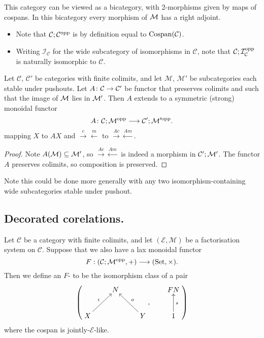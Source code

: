 This category can be viewed as a bicategory, with 2-morphisms given by maps of
cospans. In this bicategory every morphism of $\mathcal M$ has a right adjoint.

\begin{examples}
  \begin{itemize}
    \item Note that $\mathcal C; \mathcal C^{\mathrm{opp}}$ is by definition equal to
      $\operatorname{{Cospan}}(\mathcal C)$. 

    \item Writing $\mathcal I_{\mathcal C}$ for the wide subcategory of
      isomorphisms in $\mathcal C$, note that $\mathcal C;\mathcal I_{\mathcal
      C}^{\mathrm{opp}}$ is naturally isomorphic to $\mathcal C$.
  \end{itemize}
\end{examples}

\begin{lemma}
  Let $\mathcal C$, $\mathcal C'$ be categories with finite colimits, and let
  $\mathcal M$, $\mathcal M'$ be subcategories each stable under pushouts. Let
  $A{\colon} \mathcal C \to \mathcal C'$ be functor that preserves colimits and such
  that the image of $\mathcal M$ lies in $\mathcal M'$. Then $A$ extends to a symmetric
  (strong) monoidal functor
  \[
    A{\colon} \mathcal C;\mathcal M^{\mathrm{opp}} \longrightarrow \mathcal C'; \mathcal M'^{\mathrm{opp}}.
  \]
  mapping $X$ to $AX$ and $\stackrel{c}\rightarrow \stackrel{m}\leftarrow$ to
  $\stackrel{Ac}\rightarrow \stackrel{Am}\leftarrow$.
\end{lemma}
\begin{proof}
  Note $A(\mathcal M) \subseteq \mathcal M'$, so $\stackrel{Ac}\rightarrow
  \stackrel{Am}\leftarrow$ is indeed a morphism in $\mathcal C';\mathcal M'$. The functor
  $A$ preserves colimits, so composition is preserved.
\end{proof}

Note this could be done more generally with any two isomorphism-containing wide
subcategories stable under pushout.

\subsection{Decorated corelations.}

\begin{definition}
  Let $\mathcal C$ be a category with finite colimits, and let $(\mathcal E,
  \mathcal M)$ be a factorisation system on $\mathcal C$. Suppose that we also
  have a lax monoidal functor
  \[
    F: (\mathcal C;\mathcal M^{\mathrm{opp}},+) \longrightarrow (\mathrm{Set}, \times).
  \]
  Then we define an $F$- to be the isomorphism
  class of a pair
  \[
    \left(
    \begin{aligned}
      \xymatrix{
	& N \\  
	X \ar[ur]^{i} && Y \ar[ul]_{o}
      }
    \end{aligned}
    ,
    \qquad
    \begin{aligned}
      \xymatrix{
	FN \\
	1 \ar[u]_{s}
      }
    \end{aligned}
    \right)
  \]
  where the cospan is jointly-$\mathcal E$-like.
\end{definition}


